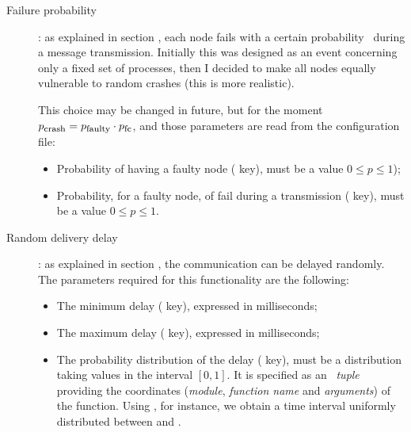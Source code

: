 \begin{description}

    \item[Failure probability]:
        as explained in section ,
        each node fails with a certain probability \PCrash\ during a
        message transmission. Initially this was designed as an event
        concerning only a fixed set of processes, then I decided to make
        all nodes equally vulnerable to random crashes (this is more
        realistic).

        This choice may be changed in future, but for the moment
        $p_{\mbox{\footnotesize{crash}}} = p_{\mbox{\footnotesize{faulty}}} \cdot p_{\mbox{\footnotesize{fc}}}$, and those
        parameters are read from the configuration file:

    \begin{itemize}

        \item   Probability of having a faulty node 
                ( key), must be a value $0 \leq p \leq
                1$);

        \item   Probability, for a faulty node, of fail during a
                transmission  ( key),
                must be a value $0 \leq p \leq 1$.

    \end{itemize}


    \item[Random delivery delay]:
        as explained in section ,
        the communication can be delayed randomly. The parameters required
        for this functionality are the following:

    \begin{itemize}
        \item   The minimum delay ( key), expressed
                in milliseconds;

        \item   The maximum delay ( key), expressed
                in milliseconds;

        \item   The probability distribution of the delay
                ( key), must be a distribution taking
                values in the interval $[0, 1]$. It is specified as an
                \Erlang\ \emph{tuple}  providing the
                coordinates (\emph{module}, \emph{function name} and
                \emph{arguments}) of the function. Using , for instance, we obtain a time interval
                uniformly distributed between  and
                .


\end{itemize}
\end{description}
